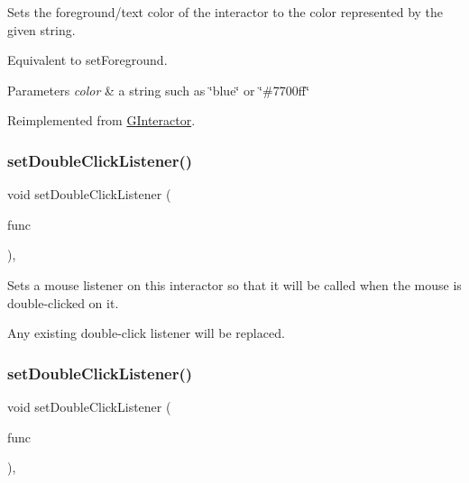 Sets the foreground/text color of the interactor to the color represented by the given string. 

Equivalent to set\+Foreground. 
\begin{DoxyParams}{Parameters}
{\em color} & a string such as \char`\"{}blue\char`\"{} or \char`\"{}\#7700ff\char`\"{} \\
\hline
\end{DoxyParams}


Reimplemented from \mbox{\hyperlink{classsgl_1_1GInteractor_a61374df6c11b52cfbb0815decdbaebc6}{G\+Interactor}}.

\mbox{\label{classsgl_1_1GInteractor_ac29f9a3462458e165fae3a1f046ee77a}} 
\subsubsection{\texorpdfstring{set\+Double\+Click\+Listener()}{setDoubleClickListener()}\hspace{0.1cm}{\footnotesize\ttfamily [1/2]}}
{\footnotesize\ttfamily void set\+Double\+Click\+Listener (\begin{DoxyParamCaption}\item[{\mbox{\hyperlink{namespacesgl_ae9f3e9eab70035da1a2b114e21357b25}{G\+Event\+Listener}}}]{func }\end{DoxyParamCaption})\hspace{0.3cm}{\ttfamily [virtual]}, {\ttfamily [inherited]}}



Sets a mouse listener on this interactor so that it will be called when the mouse is double-\/clicked on it. 

Any existing double-\/click listener will be replaced. \mbox{\label{classsgl_1_1GInteractor_a50096194d66f48c92dd4c512d41bfc76}} 
\subsubsection{\texorpdfstring{set\+Double\+Click\+Listener()}{setDoubleClickListener()}\hspace{0.1cm}{\footnotesize\ttfamily [2/2]}}
{\footnotesize\ttfamily void set\+Double\+Click\+Listener (\begin{DoxyParamCaption}\item[{\mbox{\hyperlink{namespacesgl_a54427ce97bb1c2804e4fe2b0a62e8b17}{G\+Event\+Listener\+Void}}}]{func }\end{DoxyParamCaption})\hspace{0.3cm}{\ttfamily [virtual]}, {\ttfamily [inherited]}}




